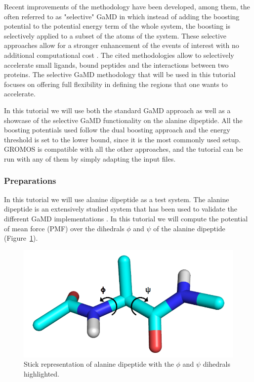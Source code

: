Recent improvements of the methodology have been developed, among them, the often referred to as "selective" GaMD in which instead of adding the boosting potential to the potential energy term of the whole system, the boosting is selectively applied to a subset of the atoms of the system. These selective approaches allow for a stronger enhancement of the events of interest with no additional computational cost \cite{miao2020ligand, wang2020peptide, wang2022protein, wang2023ligand}. The cited methodologies allow to selectively accelerate small ligands, bound peptides and the interactions between two proteins. The selective GaMD methodology that will be used in this tutorial focuses on offering full flexibility in defining the regions that one wants to accelerate.

In this tutorial we will use both the standard GaMD approach as well as a showcase of the selective GaMD functionality on the alanine dipeptide. All the boosting potentials used follow the dual boosting approach and the energy threshold is set to the lower bound, since it is the most commonly used setup. GROMOS is compatible with all the other approaches, and the tutorial can be run with any of them by simply adapting the input files.

\subsubsection{Preparations}
In this tutorial we will use alanine dipeptide as a test system. The alanine dipeptide is an extensively studied system that has been used to validate the different GaMD implementations \cite{pang2017gaussian, copeland2022gaussian, miao2015gaussian}. In this tutorial we will compute the potential of mean force (PMF) over the dihedrals $\phi$ and $\psi$ of the alanine dipeptide (Figure~\ref{aladip}).

\begin{figure}[H]
\centering
\includegraphics[scale=.3]{../07_tutorial_04/figures/aladip}
\caption{Stick representation of alanine dipeptide with the $\phi$ and $\psi$ dihedrals highlighted.}
\label{aladip}
\end{figure}
 
